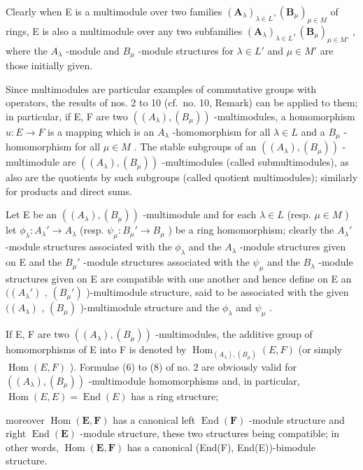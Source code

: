 Clearly when E is a multimodule over two families \((\mathbf{A}_{\lambda})_{\lambda\in L},(\mathbf{B}_{\mu})_{\mu\in M}\) of rings, E is also a multimodule over any two subfamilies \((\mathbf{A}_{\lambda})_{\lambda\in L},(\mathbf{B}_{\mu})_{\mu\in M'}\) , where the \(A_{\lambda}\) -module and \(B_{\mu}\) -module structures for \(\lambda\in L'\) and \(\mu\in M'\) are those initially given.

Since multimodules are particular examples of commutative groups with operators, the results of nos. 2 to 10 (cf.~no. 10, Remark) can be applied to them; in particular, if E, F are two \(((A_{\lambda}), (B_{\mu}))\) -multimodules, a homomorphism \(u: E \to F\) is a mapping which is an \(A_{\lambda}\) -homomorphism for all \(\lambda \in L\) and a \(B_{\mu}\) -homomorphism for all \(\mu \in M\) . The stable subgroups of an \(((A_{\lambda}), (B_{\mu}))\) -multimodule are \(((A_{\lambda}), (B_{\mu}))\) -multimodules (called submultimodules), as also are the quotients by such subgroups (called quotient multimodules); similarly for products and direct sums.

Let E be an \(((A_{\lambda}), (B_{\mu}))\) -multimodule and for each \(\lambda \in L\) (resp. \(\mu \in M\) ) let \(\phi_{\lambda}: A_{\lambda}' \to A_{\lambda}\) (resp. \(\psi_{\mu}: B_{\mu}' \to B_{\mu}\) ) be a ring homomorphism; clearly the \(A_{\lambda}'\) -module structures associated with the \(\phi_{\lambda}\) and the \(A_{\lambda}\) -module structures given on E and the \(B_{\mu}'\) -module structures associated with the \(\psi_{\mu}\) and the \(B_{\lambda}\) -module structures given on E are compatible with one another and hence define on E an \(((A_{\lambda}')\) , \((B_{\mu}')\) )-multimodule structure, said to be associated with the given \(((A_{\lambda})\) , \((B_{\mu})\) )-multimodule structure and the \(\phi_{\lambda}\) and \(\psi_{\mu}\) .

If E, F are two \(((A_{\lambda}), (B_{\mu}))\) -multimodules, the additive group of homomorphisms of E into F is denoted by \(\operatorname{Hom}_{(A_{\lambda}), (B_{\mu})}(E, F)\) (or simply \(\operatorname{Hom}(E, F)\) ). Formulae (6) to (8) of no. 2 are obviously valid for \(((A_{\lambda}), (B_{\mu}))\) -multimodule homomorphisms and, in particular, \(\operatorname{Hom}(E, E) = \operatorname{End}(E)\) has a ring structure;

moreover \(\operatorname{Hom}(\mathbf{E},\mathbf{F})\) has a canonical left \(\operatorname{End}(\mathbf{F})\) -module structure and right \(\operatorname{End}(\mathbf{E})\) -module structure, these two structures being compatible; in other words, \(\operatorname{Hom}(\mathbf{E},\mathbf{F})\) has a canonical (End(F), End(E))-bimodule structure.

